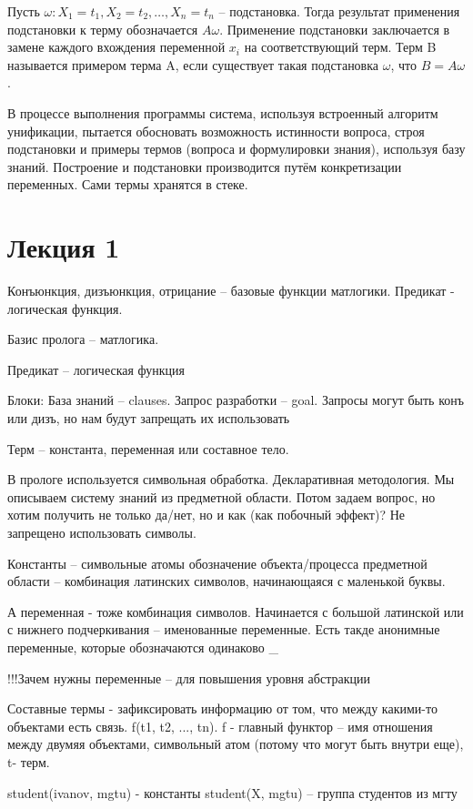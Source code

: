 \documentclass[12pt]{report}
\begin{document}
Пусть $\omega: {X}_{1} = {t}_{1} , {X}_{2} = {t}_{2},… , {X}_{n} = {t}_{n}$ -- подстановка. Тогда результат применения подстановки к терму обозначается $A\omega$. Применение подстановки заключается в замене каждого вхождения переменной $x_i$ на соответствующий терм. Терм B называется примером терма A, если существует такая подстановка $\omega$, что $B = A\omega$.

В процессе выполнения программы система, используя встроенный алгоритм унификации, пытается обосновать возможность истинности вопроса, строя подстановки и примеры термов (вопроса и формулировки знания), используя базу знаний. Построение и подстановки производится путём конкретизации переменных. Сами термы хранятся в стеке.


\chapter*{Лекция 1}
Конъюнкция, дизъюнкция, отрицание  --  базовые функции матлогики. Предикат - логическая функция.

Базис пролога -- матлогика.

Предикат -- логическая функция

Блоки:
База знаний --  clauses.
Запрос разработки -- goal.
Запросы могут быть конъ или дизъ, но нам будут запрещать их использовать

Терм -- константа, переменная или составное тело.

В прологе используется символьная обработка. Декларативная методология. Мы описываем систему знаний из предметной области. Потом задаем вопрос, но хотим получить не только да/нет, но и как (как побочный эффект)? Не запрещено использовать символы. 

Константы -- символьные атомы обозначение объекта/процесса предметной области -- комбинация латинских символов, начинающаяся с маленькой буквы.

А переменная - тоже комбинация символов. Начинается с большой латинской или с нижнего подчеркивания -- именованные переменные. Есть такде анонимные переменные, которые обозначаются одинаково \_

!!!Зачем нужны переменные -- для повышения уровня абстракции

Составные термы - зафиксировать информацию от том, что между какими-то объектами есть связь. f(t1, t2, ..., tn). f - главный функтор -- имя отношения между двумяя объектами, символьный атом (потому что могут быть внутри еще), t- терм.


student(ivanov, mgtu) - константы
student(X, mgtu) -- группа студентов из мгту
\end{document}
